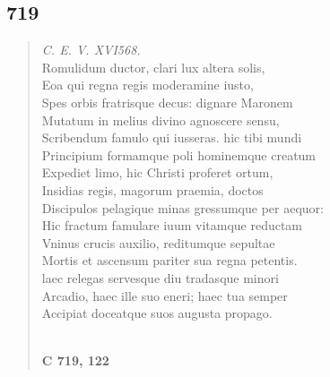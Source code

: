 \documentclass[11pt, a4paper]{report}
\begin{document}
            \subsection*{719}
      \begin{verse}
      \textit{C. E. V. XVI568.} \\ Romulidum ductor, clari lux altera solis, \\ Eoa qui regna regis moderamine iusto, \\ Spes orbis fratrisque decus: dignare Maronem \\ Mutatum in melius divino agnoscere sensu, \\ Scribendum famulo qui iusseras. hic tibi mundi \\ Principium formamque poli hominemque creatum \\ Expediet limo, hic Christi proferet ortum, \\ Insidias regis, magorum praemia, doctos \\ Discipulos pelagique minas gressumque per aequor: \\ Hic fractum famulare iuum vitamque reductam \\ Vninus crucis auxilio, reditumque sepultae \\ Mortis et ascensum pariter sua regna petentis. \\ laec relegas servesque diu tradasque minori \\ Arcadio, haec ille suo eneri; haec tua semper \\ Accipiat doceatque suos augusta propago. \\ 
        ﻿\pagebreak 
     \marginpar{[197]} \begin{center} \textbf{C 719, 122} \end{center}
      \end{verse}
  
\end{document}
